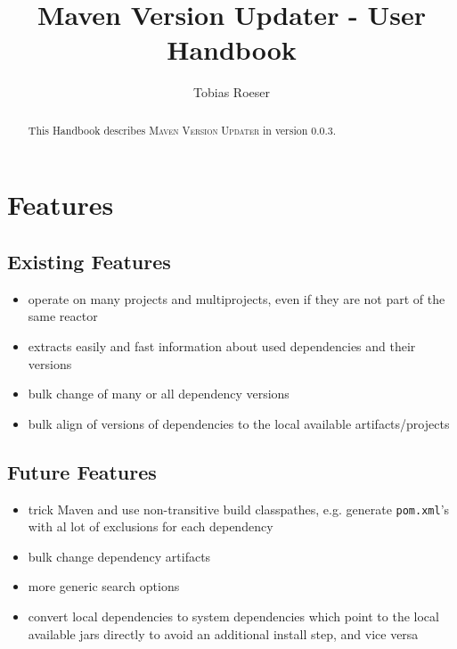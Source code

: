 \documentclass[a4paper,11pt,english,oneside,halfparskip]{scrartcl}
\title{Maven Version Updater - User Handbook}
\author{Tobias Roeser}
\newcommand{\code}[1]{\texttt{#1}}
\newcommand{\MVU}{\textsc{\small{}Maven Version Updater}}
\newcommand{\VERSION}{0.0.3}
\newcommand{\pom}{\code{pom.xml}}
\begin{document}
\renewcommand{\labelitemi}{$\triangleright$}

\maketitle

\begin{abstract}
This Handbook describes \MVU{} in version \VERSION{}.

\end{abstract}

\ifpdf{}\fi
\tableofcontents

\section{Features}

\subsection{Existing Features}

\begin{itemize}
 \item operate on many projects and multiprojects, even if they are not part of the same reactor
 \item extracts easily and fast information about used dependencies and their versions
 \item bulk change of many or all dependency versions
 \item bulk align of versions of dependencies to the local available artifacts/projects
\end{itemize}

\subsection{Future Features}

\begin{itemize}
 \item trick Maven and use non-transitive build classpathes, e.g. generate \pom's with al lot of exclusions for each dependency
 \item bulk change dependency artifacts
 \item more generic search options
 \item convert local dependencies to system dependencies which point to the local available jars directly to avoid an additional install step, and vice versa
\end{itemize}
\end{document}
